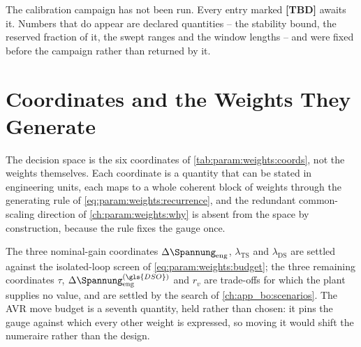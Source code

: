 \begin{summary}[Status]
	The calibration campaign has not been run.
	Every entry marked \textbf{[TBD]} awaits it.
	Numbers that do appear are declared quantities -- the stability bound, the reserved fraction of it, the swept ranges and the window lengths -- and were fixed before the campaign rather than returned by it.
\end{summary}

\section{Coordinates and the Weights They Generate}\label{ch:app_bo:space}
\label{ch:ofo:tuning:bo:problem}%
\label{ch:ofo:tuning:bo:space}%
\label{ch:app_wsel:coords}%

The decision space is the six coordinates of \cref{tab:param:weights:coords}, not the weights themselves.
Each coordinate is a quantity that can be stated in engineering units, each maps to a whole coherent block of weights through the generating rule of \cref{eq:param:weights:recurrence}, and the redundant common-scaling direction of \cref{ch:param:weights:why} is absent from the space by construction, because the rule fixes the gauge once.

The three nominal-gain coordinates $\Delta\Spannung_{\mathrm{eng}}$, $\lambda_{\mathrm{TS}}$ and $\lambda_{\mathrm{DS}}$ are settled against the isolated-loop screen of \cref{eq:param:weights:budget}; the three remaining coordinates $\tau$, $\Delta\Spannung_{\mathrm{eng}}^{(\gls{DSO})}$ and $r_{v}$ are trade-offs for which the plant supplies no value, and are settled by the search of \cref{ch:app_bo:scenarios}.
The \gls{AVR} move budget is a seventh quantity, held rather than chosen: it pins the gauge against which every other weight is expressed, so moving it would shift the numeraire rather than the design.

